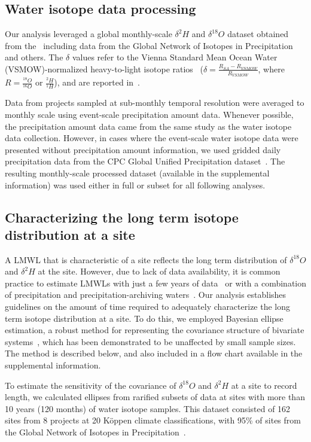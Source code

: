\documentclass[draft, linenumbers]{agujournal2018}
\begin{document}
\subsection{Water isotope data processing}
\label{sec:processing}
Our analysis leveraged a global monthly-scale $\delta^{2}H$ and $\delta^{18}O$ dataset obtained from the~\citet{spatialwi} including data from the Global Network of Isotopes in Precipitation~\citep{GNIP} and others. The $\delta$ values refer to the Vienna Standard Mean Ocean Water (VSMOW)-normalized heavy-to-light isotope ratios~\citep{Coplen1996} ($\delta = \frac{R_{SA}-R_{VSMOW}}{R_{VSMOW}}$, where $R = \frac{^{18}O}{^{16}O}$ or $\frac{^{2}H}{^{1}H}$), and are reported in~\textperthousand.

Data from projects sampled at sub-monthly temporal resolution were averaged to monthly scale using event-scale precipitation amount data. Whenever possible, the precipitation amount data came from the same study as the water isotope data collection. However, in cases where the event-scale water isotope data were presented without precipitation amount information,  we used gridded daily precipitation data from the CPC Global Unified Precipitation dataset~\citep{CPCprec}. The resulting monthly-scale processed dataset (available in the supplemental information) was used either in full or subset for all following analyses.

\subsection{Characterizing the long term isotope distribution at a site}
A LMWL that is characteristic of a site reflects the long term distribution of $\delta^{18}O$ and $\delta^{2}H$ at the site. However, due to lack of data availability, it is common practice to estimate LMWLs with just a few years of data~\citep{Benjamin2005} or with a combination of precipitation and precipitation-archiving waters~\citep{Kopec2018}. Our analysis establishes guidelines on the amount of time required to adequately characterize the long term isotope distribution at a site. To do this, we employed Bayesian ellipse estimation, a robust method for representing the covariance structure of bivariate systems~\citep{Jackson2011}, which has been demonstrated to be unaffected by small sample sizes. The method is described below, and also included in a flow chart available in the supplemental information.

To estimate the sensitivity of the covariance of $\delta^{18}O$ and $\delta^{2}H$ at a site to record length, we calculated ellipses from rarified subsets of data at sites with more than 10 years (120 months) of water isotope samples. This dataset consisted of 162 sites from 8 projects at 20 K{\"o}ppen climate classifications, with 95\% of sites from the Global Network of Isotopes in Precipitation~\citep{GNIP}. 
\end{document}
